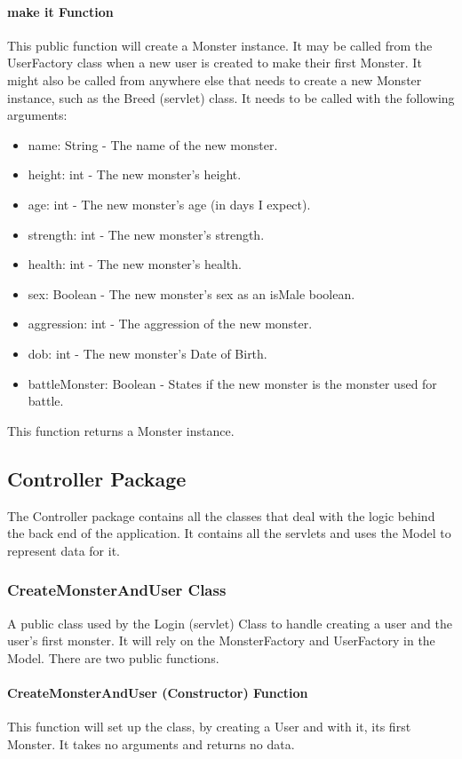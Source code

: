 \documentclass[titlepage]{article}
\begin{document}
\paragraph{make it Function}
This public function will create a Monster instance. It may be called from the UserFactory class when a new user is created to make their first Monster. It might also be called from anywhere else that needs to create a new Monster instance, such as the Breed (servlet) class. It needs to be called with the following arguments:
\begin{itemize}
\item{name: String - The name of the new monster.}
\item{height: int - The new monster's height.}
\item{age: int - The new monster's age (in days I expect).}
\item{strength: int - The new monster's strength.}
\item{health: int - The new monster's health.}
\item{sex: Boolean - The new monster's sex as an isMale boolean.}
\item{aggression: int - The aggression of the new monster.}
\item{dob: int - The new monster's Date of Birth.}
\item{battleMonster: Boolean - States if the new monster is the monster used for battle.}
\end{itemize}
This function returns a Monster instance.

\subsection{Controller Package}
The Controller package contains all the classes that deal with the logic behind the back end of the application. It contains all the servlets and uses the Model to represent data for it.

\subsubsection{CreateMonsterAndUser Class}
A public class used by the Login (servlet) Class to handle creating a user and the user's first monster. It will rely on the MonsterFactory and UserFactory in the Model. There are two public functions.

\paragraph{CreateMonsterAndUser (Constructor) Function}
This function will set up the class, by creating a User and with it, its first Monster. It takes no arguments and returns no data.
\end{document}
